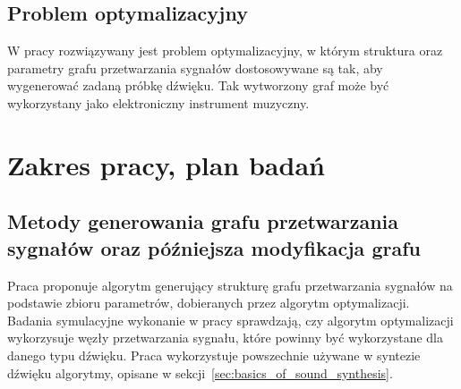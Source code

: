 \subsection{Problem optymalizacyjny}

W pracy rozwiązywany jest problem optymalizacyjny, w którym
struktura oraz parametry grafu przetwarzania sygnałów dostosowywane
są tak, aby wygenerować zadaną próbkę dźwięku. Tak wytworzony
graf może być wykorzystany jako elektroniczny instrument muzyczny. 





\section{Zakres pracy, plan badań}\label{chap:thesis_scope}

\subsection{Metody generowania grafu przetwarzania sygnałów oraz późniejsza modyfikacja grafu}

Praca proponuje algorytm generujący strukturę grafu przetwarzania sygnałów na
podstawie zbioru parametrów, dobieranych przez algorytm optymalizacji.
Badania symulacyjne wykonanie w pracy sprawdzają, czy algorytm optymalizacji
wykorzysuje węzły przetwarzania sygnału, które powinny być wykorzystane dla danego
typu dźwięku.
Praca wykorzystuje powszechnie używane w syntezie dźwięku algorytmy,
opisane w sekcji~\ref{sec:basics_of_sound_synthesis}.


